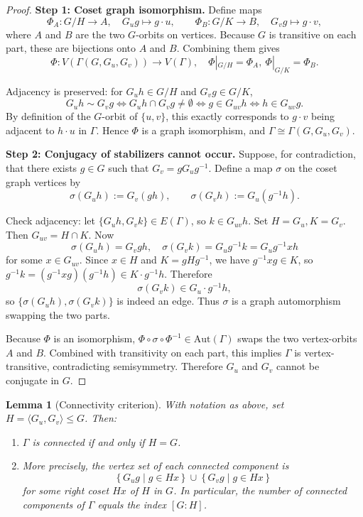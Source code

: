 \documentclass[12pt,a4paper,openany]{book}
\newtheorem{lemma}{Lemma}[section]
\newcommand{\Aut}{\mathrm{Aut}}
\begin{document}
\begin{proof}
\textbf{Step 1: Coset graph isomorphism.}  
Define maps
\[
\Phi_A: G/H \to A, \quad G_u g \mapsto g \cdot u, \qquad 
\Phi_B: G/K \to B, \quad G_v g \mapsto g \cdot v,
\]
where $A$ and $B$ are the two $G$-orbits on vertices. Because $G$ is transitive on each part, these are bijections onto $A$ and $B$. Combining them gives
\[
\Phi: V(\Gamma(G,G_u,G_v)) \to V(\Gamma), \quad \Phi|_{G/H} = \Phi_A, \ \Phi|_{G/K} = \Phi_B.
\]

Adjacency is preserved: for $G_u h \in G/H$ and $G_v g \in G/K$,
\[
G_u h \sim G_v g \iff G_u h \cap G_v g \neq \emptyset \iff g \in G_{uv} h \iff h \in G_{uv} g.
\]
By definition of the $G$-orbit of $\{u,v\}$, this exactly corresponds to $g\cdot v$ being adjacent to $h\cdot u$ in $\Gamma$. Hence $\Phi$ is a graph isomorphism, and $\Gamma \cong \Gamma(G,G_u,G_v)$.

\medskip
\textbf{Step 2: Conjugacy of stabilizers cannot occur.}  
Suppose, for contradiction, that there exists $g\in G$ such that $G_v = g G_u g^{-1}$. Define a map $\sigma$ on the coset graph vertices by
\[
\sigma(G_u h) := G_v (g h), \qquad \sigma(G_v h) := G_u (g^{-1} h).
\]

Check adjacency: let $\{G_u h, G_v k\} \in E(\Gamma)$, so $k \in G_{uv} h$. Set $H = G_u, K = G_v$. Then $G_{uv} = H \cap K$. Now
\[
\sigma(G_u h) = G_v g h, \quad \sigma(G_v k) = G_u g^{-1} k = G_u g^{-1} x h
\]
for some $x \in G_{uv}$. Since $x \in H$ and $K = g H g^{-1}$, we have $g^{-1} x g \in K$, so $g^{-1} k = (g^{-1} x g)(g^{-1} h) \in K \cdot g^{-1} h$. Therefore
\[
\sigma(G_v k) \in G_u \cdot g^{-1} h,
\]
so $\{\sigma(G_u h), \sigma(G_v k)\}$ is indeed an edge. Thus $\sigma$ is a graph automorphism swapping the two parts.

Because $\Phi$ is an isomorphism, $\Phi \circ \sigma \circ \Phi^{-1} \in \Aut(\Gamma)$ swaps the two vertex-orbits $A$ and $B$. Combined with transitivity on each part, this implies $\Gamma$ is vertex-transitive, contradicting semisymmetry. Therefore $G_u$ and $G_v$ cannot be conjugate in $G$.

\end{proof}


\begin{lemma}[Connectivity criterion]
With notation as above, set $H=\langle G_u,G_v\rangle\le G$. Then:
\begin{enumerate}
\item $\Gamma$ is connected if and only if $H=G$.
\item More precisely, the vertex set of each connected component is
\[
\{\,G_u g \mid g\in Hx\,\}\ \cup\ \{\,G_v g \mid g\in Hx\,\}
\]
for some right coset $Hx$ of $H$ in $G$. In particular, the number of connected
components of $\Gamma$ equals the index $[G:H]$.
\end{enumerate}
\end{lemma}
\end{document}

